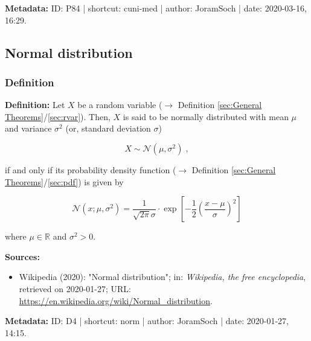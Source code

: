 \documentclass[a4paper,12pt,twoside]{book}
\begin{document}
\vspace{1em}
\textbf{Metadata:} ID: P84 | shortcut: cuni-med | author: JoramSoch | date: 2020-03-16, 16:29.
\vspace{1em}



\subsection{Normal distribution}

\subsubsection[\textit{Definition}]{Definition} \label{sec:norm}
\setcounter{equation}{0}

\textbf{Definition:} Let $X$ be a random variable ($\rightarrow$ Definition \ref{sec:General Theorems}/\ref{sec:rvar}). Then, $X$ is said to be normally distributed with mean $\mu$ and variance $\sigma^2$ (or, standard deviation $\sigma$)

\begin{equation} \label{eq:norm-norm}
X \sim \mathcal{N}(\mu, \sigma^2) \; ,
\end{equation}

if and only if its probability density function ($\rightarrow$ Definition \ref{sec:General Theorems}/\ref{sec:pdf}) is given by

\begin{equation} \label{eq:norm-norm-pdf}
\mathcal{N}(x; \mu, \sigma^2) = \frac{1}{\sqrt{2 \pi} \sigma} \cdot \exp \left[ -\frac{1}{2} \left( \frac{x-\mu}{\sigma} \right)^2 \right]
\end{equation}

where $\mu \in \mathbb{R}$ and $\sigma^2 > 0$.


\vspace{1em}
\textbf{Sources:}
\begin{itemize}
\item Wikipedia (2020): "Normal distribution"; in: \textit{Wikipedia, the free encyclopedia}, retrieved on 2020-01-27; URL: \url{https://en.wikipedia.org/wiki/Normal_distribution}.
\end{itemize}


\vspace{1em}
\textbf{Metadata:} ID: D4 | shortcut: norm | author: JoramSoch | date: 2020-01-27, 14:15.
\vspace{1em}
\end{document}
